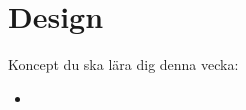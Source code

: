 \chapter{Design}\label{chapter:W13}
Koncept du ska lära dig denna vecka:
\begin{multicols}{2}\begin{itemize}[nosep,label={$\square$},leftmargin=*]
\item\end{itemize}\end{multicols}
